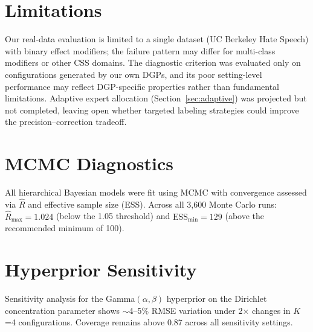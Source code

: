 \documentclass[11pt]{article}
\begin{document}
\section*{Limitations}

Our real-data evaluation is limited to a single dataset (UC Berkeley Hate Speech) with binary effect modifiers; the failure pattern may differ for multi-class modifiers or other CSS domains.
The diagnostic criterion was evaluated only on configurations generated by our own DGPs, and its poor setting-level performance may reflect DGP-specific properties rather than fundamental limitations.
Adaptive expert allocation (Section~\ref{sec:adaptive}) was projected but not completed, leaving open whether targeted labeling strategies could improve the precision--correction tradeoff.



\appendix

\section{MCMC Diagnostics}
\label{app:mcmc}

All hierarchical Bayesian models were fit using MCMC with convergence assessed via $\hat{R}$ and effective sample size (ESS).
Across all 3{,}600 Monte Carlo runs: $\hat{R}_{\max} = 1.024$ (below the 1.05 threshold) and $\text{ESS}_{\min} = 129$ (above the recommended minimum of 100).

\section{Hyperprior Sensitivity}
\label{app:hyperprior}

Sensitivity analysis for the Gamma$(\alpha, \beta)$ hyperprior on the Dirichlet concentration parameter shows $\sim$4--5\% RMSE variation under 2$\times$ changes in $K$=4 configurations.
Coverage remains above 0.87 across all sensitivity settings.
\end{document}
